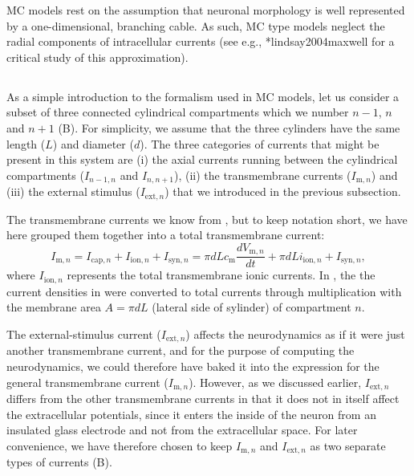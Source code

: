 MC models rest on the assumption that neuronal morphology is well represented by a one-dimensional, branching cable. As such, MC type models neglect the radial components of intracellular currents (see e.g., \citeasnoun**{lindsay2004maxwell} for a critical study of this approximation). 


\subsection{}
\label{sec:Neuron:Active_multicomp}
As a simple introduction to the formalism used in MC models, let us consider a subset of three connected cylindrical compartments which we number $n-1$, $n$ and $n+1$ (B). For simplicity, we assume that the three cylinders have the same length ($L$) and diameter ($d$). The three categories of currents that might be present in this system are (i) the axial currents running between the cylindrical compartments ($I_{n-1,n}$ and $I_{n,n+1}$), (ii) the transmembrane currents ($I_{\mathrm{m},n}$) and (iii) the external stimulus ($I_{\mathrm{ext},n}$) that we introduced in the previous subsection. 

The transmembrane currents we know from , but to keep notation short, we have 
here grouped them together into a total transmembrane current:
\begin{equation}
I_{\mathrm{m},n} = I_{\mathrm{cap},n} + I_{\mathrm{ion},n} + I_{\mathrm{syn},n} = \pi d L c_\text{m} \frac{dV_{\mathrm{m},n}}{dt} + \pi d L i_{\mathrm{ion},n}  + I_{\mathrm{syn},n}, 
\label{eq:Neuron:Imemb}
\end{equation}
where $I_{\mathrm{ion},n}$ represents the total transmembrane ionic currents. In , the the current densities in  were converted to total currents through multiplication with the membrane area $A=\pi d L$ (lateral side of sylinder) of compartment $n$.

The external-stimulus current ($I_{\mathrm{ext},n}$) affects the neurodynamics as if it were just another transmembrane current, and for the purpose of computing the neurodynamics, we could therefore have baked it into the expression for the general transmembrane current ($I_{\mathrm{m},n}$). However, as we discussed earlier, $I_{\mathrm{ext},n}$ differs from the other transmembrane currents in that it does not in itself affect the extracellular potentials, since it enters the inside of the neuron from an insulated glass electrode and not from the extracellular space. For later convenience, we have therefore chosen to keep $I_{\mathrm{m},n}$ and $I_{\mathrm{ext},n}$ as two separate types of currents (B). 

